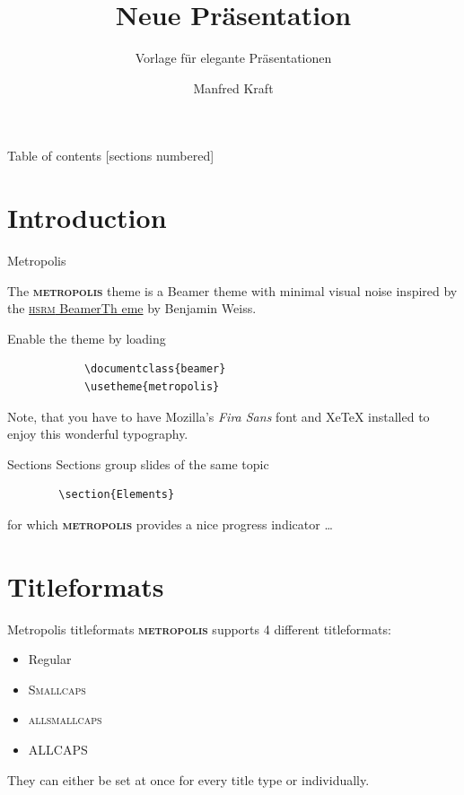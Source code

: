 \documentclass[12pt]{beamer}
\title{Neue Präsentation}
\subtitle{Vorlage für elegante Präsentationen}
\date{}
\author{Manfred Kraft}%
\institute{www.bluehende-Heimat.de}
\newcommand{\themename}{\textbf{\textsc{metropolis}}\xspace}
\begin{document}
	
	\maketitle
	
	\begin{frame}{Table of contents}
		[sections numbered]
		\tableofcontents%
	\end{frame}
	
	\section[Intro]{Introduction}
	
	\begin{frame}[fragile]{Metropolis}
		
		The \themename theme is a Beamer theme with minimal visual noise
		inspired by the 
		\href{https://github.com/hsrmbeamertheme/hsrmbeamertheme}						{\textsc{hsrm} BeamerTh eme} by Benjamin Weiss.
		
		Enable the theme by loading
		
		\begin{verbatim}    
			\documentclass{beamer}
			\usetheme{metropolis}
		\end{verbatim}
		
		Note, that you have to have Mozilla's \emph{Fira Sans} font and XeTeX
		installed to enjoy this wonderful typography.
	\end{frame}
	
	\begin{frame}[fragile]{Sections}
		Sections group slides of the same topic
		
		\begin{verbatim}    
		\section{Elements}
		\end{verbatim}
		
		for which \themename provides a nice progress indicator \ldots
		
	\end{frame}
	
	\section{Titleformats}
	
	\begin{frame}{Metropolis titleformats}
		\themename supports 4 different titleformats:
		\begin{itemize}
			\item Regular
			\item \textsc{Smallcaps}
			\item \textsc{allsmallcaps}
			\item ALLCAPS
		\end{itemize}
		They can either be set at once for every title type or individually.
	\end{frame}
	
\end{document}
